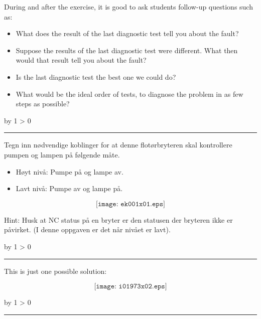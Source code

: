 \documentclass[12pt,a4paper]{article}
\def\oppgave{
            \advance\questnum by 1
            \ifnum \questnum > 0
                 \hrule
                 \vskip 3pt
                 \leftline{Oppgave \the\questnum}
                 \vskip 3pt \fi}
\def\svar{
           \advance\answnum by 1
           \ifnum \answnum > 0
                \hrule
                \vskip 3pt
                \leftline{Svar \the\answnum}
                \vskip 3pt \fi}
\def\notes{
           \advance\explnum by 1
           \ifnum \explnum > 0
                \hrule
                \vskip 3pt
                \leftline{Notes \the\explnum}
                \vskip 3pt \fi}
\begin{document}
During and after the exercise, it is good to ask students follow-up questions such as:

\begin{itemize}
\item{} What does the result of the last diagnostic test tell you about the fault?
\item{} Suppose the results of the last diagnostic test were different.  What then would that result tell you about the fault?
\item{} Is the last diagnostic test the best one we could do?
\item{} What would be the ideal order of tests, to diagnose the problem in as few steps as possible?
\end{itemize}



\vfil \eject 




\oppgave{} 

Tegn inn nødvendige koblinger for at denne flotørbryteren skal kontrollere pumpen og lampen på følgende måte.

\begin{itemize}
\item{} Høyt nivå: Pumpe på og lampe av. 
\item{} Lavt nivå: Pumpe av og lampe på. 
\end{itemize}

$$\texttt{[image: ek001x01.eps]}$$

Hint: Husk at NC status på en bryter er den statusen der bryteren ikke er påvirket. (I denne oppgaven er det når nivået er lavt).


\vskip 10pt \filbreak 





\svar{} 

This is just one possible solution:

$$\texttt{[image: i01973x02.eps]}$$

\vskip 10pt \filbreak 





\notes{} 


\end{document}

